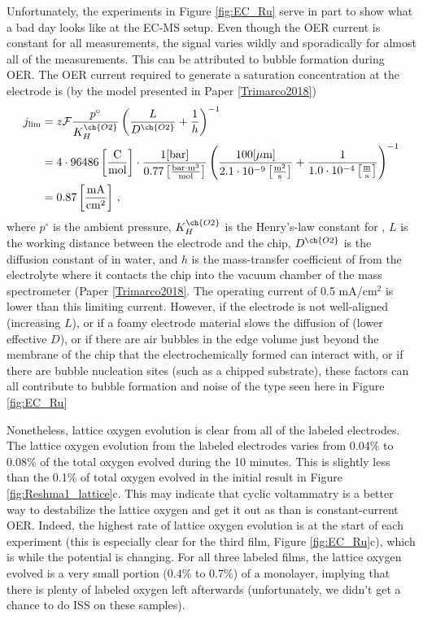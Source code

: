 Unfortunately, the experiments in Figure \ref{fig:EC_Ru} serve in part to show what a bad day looks like at the EC-MS setup. Even though the OER current is constant for all measurements, the  signal varies wildly and sporadically for almost all of the measurements. This can be attributed to bubble formation during OER. The OER current required to generate a saturation concentration at the electrode is (by the model presented in Paper \ref{Trimarco2018}) 
\begin{align}
j_{\text{lim}} &= z\mathcal{F}\frac{p^\circ}{K_H^{\ch{O2}}}\left(\frac{L}{D^{\ch{O2}}} + \frac{1}{h}\right)^{-1}\label{eq:limiting} \\
 &= 4\cdot 96486 \left[\frac{\text{C}}{\text{mol}}\right]\cdot\frac{1 \text{[bar]}}{0.77 \left[\frac{\text{bar}\cdot\text{m}^3}{\text{mol}}\right]} \left(\frac{100[\mu\text{m}]}{2.1\cdot 10^{-9} \left[\frac{\text{m}^2}{\text{s}}\right]} + \frac{1}{1.0\cdot 10^{-4} \left[\frac{\text{m}}{\text{s}}\right]} \right)^{-1}\\
 &=0.87 \left[\frac{\text{mA}}{\text{cm}^2}\right]\,,
\end{align}
where $p^\circ$ is the ambient pressure, $K_H^{\ch{O2}}$ is the Henry's-law constant for , $L$ is the working distance between the electrode and the chip, $D^{\ch{O2}}$ is the diffusion constant of  in water, and $h$ is the mass-transfer coefficient of  from the electrolyte where it contacts the chip into the vacuum chamber of the mass spectrometer (Paper \ref{Trimarco2018}. The operating current of 0.5 mA/cm$^2$ is lower than this limiting current. However, if the electrode is not well-aligned (increasing $L$), or if a foamy electrode material slows the diffusion of  (lower effective $D$), or if there are air bubbles in the edge volume just beyond the membrane of the chip that the electrochemically formed  can interact with, or if there are bubble nucleation sites (such as a chipped substrate), these factors can all contribute to bubble formation and noise of the type seen here in Figure \ref{fig:EC_Ru}

Nonetheless, lattice oxygen evolution is clear from all of the labeled electrodes. The lattice oxygen evolution from the labeled  electrodes varies from 0.04\% to 0.08\% of the total oxygen evolved during the 10 minutes. This is slightly less than the 0.1\% of total oxygen evolved in the initial result in Figure \ref{fig:Reshma1_lattice}c. This may indicate that cyclic voltammatry is a better way to destabilize the lattice oxygen and get it out as  than is constant-current OER. Indeed, the highest rate of lattice oxygen evolution is at the start of each experiment (this is especially clear for the third film, Figure \ref{fig:EC_Ru}c), which is while the potential is changing. For all three labeled  films, the lattice oxygen evolved is a very small portion (0.4\% to 0.7\%) of a monolayer, implying that there is plenty of labeled oxygen left afterwards (unfortunately, we didn't get a chance to do ISS on these samples).

